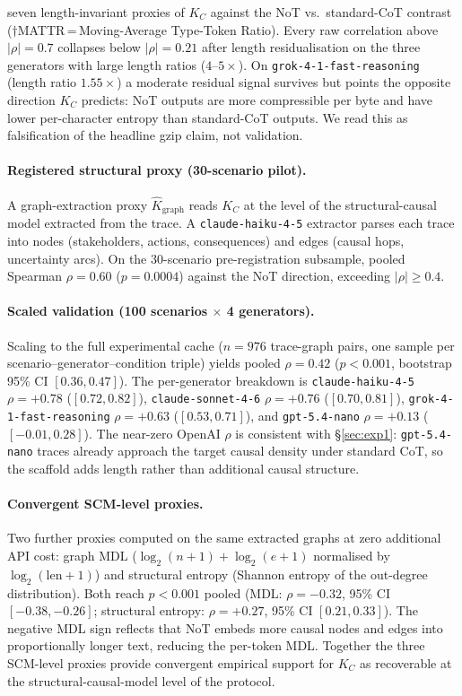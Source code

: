 \documentclass[11pt]{article}
\begin{document}
\begin{table}[!tbp]
{seven length-invariant proxies of $K_C$ against the NoT vs.\
standard-CoT contrast ($\dagger$MATTR\,=\,Moving-Average Type-Token
Ratio). Every raw correlation above $|\rho|{=}0.7$ collapses below
$|\rho|{=}0.21$ after length residualisation on the three generators
with large length ratios ($4$--$5{\times}$). On
\texttt{grok-4-1-fast-reasoning} (length ratio $1.55{\times}$) a
moderate residual signal survives but points the opposite direction
$K_C$ predicts: NoT outputs are more compressible per byte and have
lower per-character entropy than standard-CoT outputs. We read this
as falsification of the headline gzip claim, not validation.}
\label{tab:kc_corr}
\end{table}

\paragraph{Registered structural proxy (30-scenario pilot).}
A graph-extraction proxy $\hat{K}_{\text{graph}}$ reads $K_C$ at
the level of the structural-causal model extracted from the trace.
A \texttt{claude-haiku-4-5} extractor parses each trace into nodes
(stakeholders, actions, consequences) and edges (causal hops,
uncertainty arcs). On the 30-scenario pre-registration subsample,
pooled Spearman $\rho = 0.60$ ($p = 0.0004$) against the NoT
direction, exceeding $|\rho| \geq 0.4$.

\paragraph{Scaled validation (100 scenarios $\times$ 4 generators).}
Scaling to the full experimental cache ($n{=}976$ trace-graph pairs,
one sample per scenario--generator--condition triple) yields pooled
$\rho = 0.42$ ($p < 0.001$, bootstrap 95\% CI $[0.36, 0.47]$). The
per-generator breakdown is \texttt{claude-haiku-4-5} $\rho{=}{+0.78}$
($[0.72, 0.82]$), \texttt{claude-sonnet-4-6} $\rho{=}{+0.76}$
($[0.70, 0.81]$), \texttt{grok-4-1-fast-reasoning} $\rho{=}{+0.63}$
($[0.53, 0.71]$), and \texttt{gpt-5.4-nano} $\rho{=}{+0.13}$
($[-0.01, 0.28]$). The near-zero OpenAI $\rho$ is consistent with
\S\ref{sec:exp1}: \texttt{gpt-5.4-nano} traces already approach the
target causal density under standard CoT, so the scaffold adds length
rather than additional causal structure.

\paragraph{Convergent SCM-level proxies.}
Two further proxies computed on the same extracted graphs at zero
additional API cost: graph MDL ($\log_2(n{+}1){+}\log_2(e{+}1)$
normalised by $\log_2(\text{len}{+}1)$) and structural entropy
(Shannon entropy of the out-degree distribution). Both reach
$p < 0.001$ pooled (MDL: $\rho = -0.32$, 95\% CI $[-0.38, -0.26]$;
structural entropy: $\rho = +0.27$, 95\% CI $[0.21, 0.33]$). The
negative MDL sign reflects that NoT embeds more causal nodes and
edges into proportionally longer text, reducing the per-token MDL.
Together the three SCM-level proxies provide convergent empirical
support for $K_C$ as recoverable at the structural-causal-model
level of the protocol.
\end{document}
